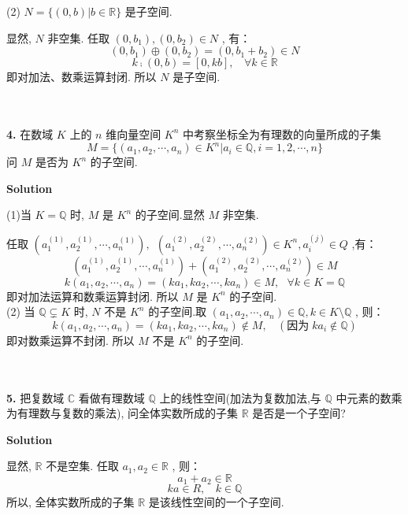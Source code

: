 \documentclass[11pt,a4paper,openany,oneside]{book}
\newcommand\Solution{\noindent\textbf{\textsf{Solution}}\par\medskip}
\begin{document}
(2)  $ N = \{(0, b)| b \in \mathbb{R} \} $ 是子空间.

显然,  $ N $ 非空集. 任取 $ (0, b_1), (0, b_2) \in N $ , 有：
 $$  (0, b_1) \oplus  (0, b_2) = (0, b_1 + b_2) \in N  $$ 
 $$  k \comp (0, b) = \left[ 0, kb \right], \ \ \ \ \forall k \in \mathbb{R}  $$  即对加法、数乘运算封闭. 所以 $ N $ 是子空间. \\  \\  \\

\begin{myexample}
	\textbf{4.} 
在数域 $ K $ 上的 $ n $ 维向量空间 $ K^n $ 中考察坐标全为有理数的向量所成的子集
 $$  M = \{(a_1, a_2, \cdots, a_n) \in K^n | a_i \in \mathbb{Q}, i = 1, 2, \cdots, n  \}  $$ 
问 $ M $ 是否为 $ K^n $ 的子空间.  \\  

\end{myexample}
\Solution 

(1)当 $ K = \mathbb{Q}  $ 时,  $ M $ 是 $ K^n $ 的子空间.显然 $ M $ 非空集.

任取 $ (a_1^{(1)}, a_2^{(1)}, \cdots, a_n^{(1)}),\ \  (a_1^{(2)}, a_2^{(2)}, \cdots, a_n^{(2)}) \in K^n, a_i^{(j)} \in Q  $ ,有：
 $$  (a_1^{(1)}, a_2^{(1)}, \cdots, a_n^{(1)}) + (a_1^{(2)}, a_2^{(2)}, \cdots, a_n^{(2)}) \in M  $$ 
 $$  k(a_1, a_2, \cdots, a_n) =  (ka_1, ka_2, \cdots, ka_n)\in M, \ \ \ \forall k \in K = \mathbb{Q}  $$ 
即对加法运算和数乘运算封闭. 所以 $ M $ 是 $ K^n $ 的子空间.  \\ 

(2) 当 $ \mathbb{Q} \subsetneq K $ 时,  $ N $ 不是 $ K^n $ 的子空间.取 $ (a_1, a_2, \cdots, a_n) \in \mathbb{Q}, k \in K \setminus \mathbb{Q} $ , 则：
 $$  k(a_1, a_2, \cdots, a_n) = (ka_1, ka_2, \cdots, ka_n) \notin M, \ \ \ \ (\text{因为} \;ka_i \notin \mathbb{Q})  $$ 
即对数乘运算不封闭. 所以 $ M $ 不是 $ K^n $ 的子空间.  \\  \\  \\


\begin{myexample}
	\textbf{5.} 
把复数域 $ \mathbb{C} $ 看做有理数域 $ \mathbb{Q} $ 上的线性空间(加法为复数加法,与 $ \mathbb{Q} $ 中元素的数乘为有理数与复数的乘法), 问全体实数所成的子集 $ \mathbb{R} $ 是否是一个子空间?  \\  

\end{myexample}
\Solution 

显然,  $ \mathbb{R} $ 不是空集. 任取 $ a_1, a_2 \in \mathbb{R} $ , 则：
 $$  a_1 + a_2 \in \mathbb{R}  $$ 
 $$  ka \in R, \ \ \ \ k \in \mathbb{Q}  $$ 
所以, 全体实数所成的子集 $ \mathbb{R} $ 是该线性空间的一个子空间.   \\  \\   \\ 
\end{document}
